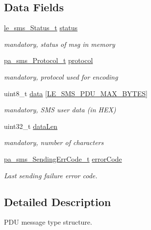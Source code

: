 \subsection*{Data Fields}
\begin{DoxyCompactItemize}
\item 
\hyperlink{le__sms__interface_8h_a18a1937acb5878ae01a9d668fe5070b6}{le\+\_\+sms\+\_\+\+Status\+\_\+t} \hyperlink{structpa__sms___pdu__t_ac972d79efde081b3d0a2b3218898b765}{status}
\begin{DoxyCompactList}\small\item\em mandatory, status of msg in memory \end{DoxyCompactList}\item 
\hyperlink{pa__sms_8h_a2bfd5b5bfad47343ed4776737b50af0f}{pa\+\_\+sms\+\_\+\+Protocol\+\_\+t} \hyperlink{structpa__sms___pdu__t_a9080617b3596b033601136c81bdbc6c0}{protocol}
\begin{DoxyCompactList}\small\item\em mandatory, protocol used for encoding \end{DoxyCompactList}\item 
uint8\+\_\+t \hyperlink{structpa__sms___pdu__t_a5fe8eb17b0b853fa61ca1ac6d813e63f}{data} \mbox{[}\hyperlink{le__sms__interface_8h_aaa740f36bbc6d13d0b355d3dc2d8d4dc}{L\+E\+\_\+\+S\+M\+S\+\_\+\+P\+D\+U\+\_\+\+M\+A\+X\+\_\+\+B\+Y\+T\+ES}\mbox{]}
\begin{DoxyCompactList}\small\item\em mandatory, S\+MS user data (in H\+EX) \end{DoxyCompactList}\item 
uint32\+\_\+t \hyperlink{structpa__sms___pdu__t_a540bfee9b53c597323088a0b9d39de3a}{data\+Len}
\begin{DoxyCompactList}\small\item\em mandatory, number of characters \end{DoxyCompactList}\item 
\hyperlink{structpa__sms___sending_err_code__t}{pa\+\_\+sms\+\_\+\+Sending\+Err\+Code\+\_\+t} \hyperlink{structpa__sms___pdu__t_a61e788793f81312aac8bbcef8e7e6e8d}{error\+Code}
\begin{DoxyCompactList}\small\item\em Last sending failure error code. \end{DoxyCompactList}\end{DoxyCompactItemize}


\subsection{Detailed Description}
P\+DU message type structure. 

